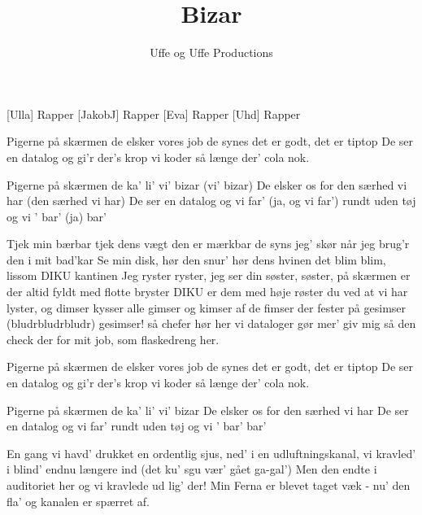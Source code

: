 \documentclass[a4paper,11pt]{article}
\title{Bizar}
\author{Uffe og Uffe Productions}
\begin{document}
\maketitle

\begin{roles}
[Ulla] Rapper
[JakobJ] Rapper
[Eva] Rapper
[Uhd] Rapper
\end{roles}

\begin{props}
\end{props}

  
\begin{song}

Pigerne på skærmen de elsker vores job
de synes det er godt, det er tiptop
De ser en datalog og gi'r der's krop
vi koder så længe der' cola nok.

Pigerne på skærmen de ka' li' vi' bizar (vi' bizar)
De elsker os for den særhed vi har (den særhed vi har)
De ser en datalog og vi far' (ja, og vi far')
rundt uden tøj og vi ' bar' (ja) bar'


Tjek min bærbar
tjek dens vægt den er mærkbar
de syns jeg' skør når jeg brug'r den i mit bad'kar
Se min disk, hør den snur' hør dens hvinen
det blim blim, lissom DIKU kantinen
Jeg ryster ryster,
jeg ser din søster, søster,
på skærmen er der altid fyldt med flotte bryster
DIKU er dem med høje røster
du ved at vi har lyster, og dimser
kysser alle gimser
og kimser af de fimser
der fester på gesimser
(bludrbludrbludr)
gesimser! så chefer hør her
vi dataloger gør mer'
giv mig så den check der
for mit job, som flaskedreng her.


Pigerne på skærmen de elsker vores job
de synes det er godt, det er tiptop
De ser en datalog og gi'r der's krop
vi koder så længe der' cola nok.

Pigerne på skærmen de ka' li' vi' bizar
De elsker os for den særhed vi har
De ser en datalog og vi far'
rundt uden tøj og vi ' bar' bar'



En gang vi havd' drukket en ordentlig sjus,
ned' i en udluftningskanal,
vi kravled' i blind' endnu længere ind
(det ku' sgu vær' gået ga-gal')
Men den endte i auditoriet her
og vi kravlede ud lig' der!
Min Ferna er blevet taget væk - nu' den fla'
og kanalen er spærret af.



\end{song}
\end{document}
